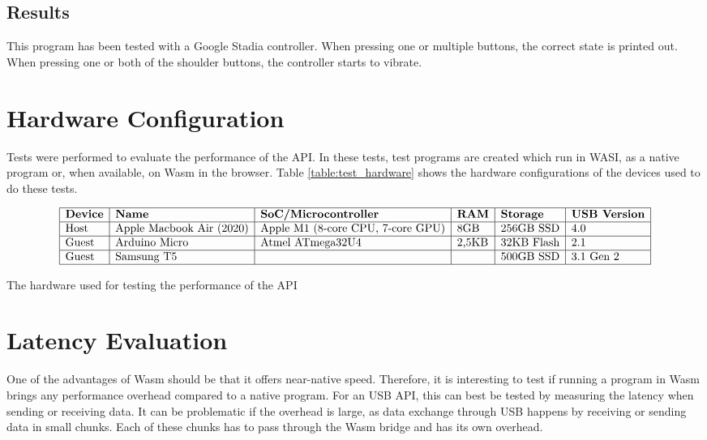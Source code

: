 \subsection{Results}
This program has been tested with a Google Stadia controller. When pressing one or multiple buttons, the correct state is printed out. When pressing one or both of the shoulder buttons, the controller starts to vibrate.



\section{Hardware Configuration}

Tests were performed to evaluate the performance of the API. In these tests, test programs are created which run in WASI, as a native program or, when available, on Wasm in the browser. Table \ref{table:test_hardware} shows the hardware configurations of the devices used to do these tests.

\begin{table}[H]
\[
\begin{array}{|l|l|l|l|l|l|}
\hline
\textbf{Device} & \textbf{Name} & \textbf{SoC/Microcontroller} & \textbf{RAM} & \textbf{Storage} & \textbf{USB Version} \\
\hline
\text{Host} & \text{Apple Macbook Air (2020)} & \text{Apple M1 (8-core CPU, 7-core GPU)} & \text{8GB} & \text{256GB SSD} & \text{4.0} \\

\hline
\text{Guest} & \text{Arduino Micro} & \text{Atmel ATmega32U4} & \text{2,5KB} & \text{32KB Flash} & \text{2.1} \\

\hline
\text{Guest} & \text{Samsung T5} & \text{} & \text{} & \text{500GB SSD} & \text{3.1 Gen 2} \\
\hline
\end{array}
\]
\caption{The hardware used for testing the performance of the API}
\label{table:test_hardware}
\end{table}


\section{Latency Evaluation}

One of the advantages of \acrshort{Wasm} should be that it offers near-native speed. Therefore, it is interesting to test if running a program in Wasm brings any performance overhead compared to a native program. For an USB API, this can best be tested by measuring the latency when sending or receiving data. It can be problematic if the overhead is large, as data exchange through USB happens by receiving or sending data in small chunks. Each of these chunks has to pass through the Wasm bridge and has its own overhead.

